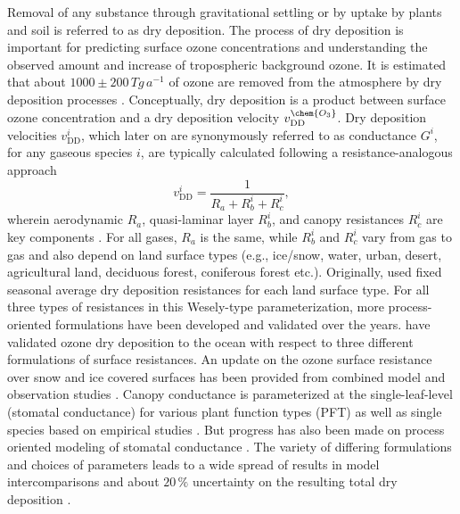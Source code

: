 \documentclass[gmd, manuscript]{copernicus}
\begin{document}
Removal of any substance through gravitational settling or by uptake by plants and soil is referred to as dry deposition. The process of dry deposition is important for predicting surface ozone concentrations and understanding the observed amount and increase of tropospheric background ozone. It is estimated that about $1000 \pm 200\,\unit{Tg\,a^{-1}}$ of ozone are removed from the atmosphere by dry deposition processes \citep{ACP:Monks2015}. Conceptually, dry deposition is a product between surface ozone concentration  and a dry deposition velocity $v^\chem{O_3}_\text{DD}$. Dry deposition velocities $v^i_\text{DD}$, which later on are synonymously referred to as conductance $G^i$, for any gaseous species $i$, are typically calculated following a resistance-analogous approach
\begin{equation}
  v^i_\text{DD} = \frac{1}{R_a + R^i_b + R^i_c},
  \label{eq:drydep_velo}
\end{equation}
wherein aerodynamic $R_a$, quasi-laminar layer $R^i_b$, and canopy resistances $R^i_c$ are key components \citep{AE:Wesely1989,ACP:Seinfeld2006}. For all gases, $R_a$ is the same, while $R^i_b$ and $R^i_c$ vary from gas to gas and also depend on land surface types (e.g., ice/snow, water, urban, desert, agricultural land, deciduous forest, coniferous forest etc.). Originally, \citet{AE:Wesely1989} used fixed seasonal average dry deposition resistances for each land surface type. For all three types of resistances in this Wesely-type parameterization, more process-oriented formulations have been developed and validated over the years. \citet{ACP:Luhar2017} have validated ozone dry deposition to the ocean with respect to three different formulations of surface resistances. An update on the ozone surface resistance over snow and ice covered surfaces has been provided from combined model and observation studies \citep[][$v^\chem{O_3}_\text{ice/snow} = 1/10000\,\unit{m\,s^{-1}}$]{ACP:Helmig2007}. Canopy conductance is parameterized at the single-leaf-level (stomatal conductance) for various plant function types (PFT) as well as single species based on empirical studies \citep{PTRS:Jarvis1976, BallBerry1987, ACP:Simpson2012, ICP:MappingManual2017}. But progress has also been made on process oriented modeling of stomatal conductance \citep{AFM:Anderson2000,PP:Buckley2017}. The variety of differing formulations and choices of parameters leads to a wide spread of results in model intercomparisons \citep{ACP:Hardacre2015,AE:Derwent2018} and about $20\,\unit{\%}$ uncertainty on the resulting total dry deposition \citep{ACP:Monks2015}.\\
\end{document}

